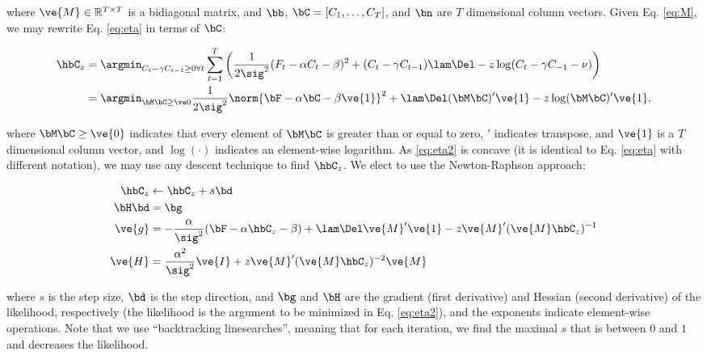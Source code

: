 \noindent where $\ve{M} \in \mathbb{R}^{T \times T}$ is a bidiagonal matrix,  and $\bb$, $\bC=[C_1,\ldots, C_T]$, and $\bn$ are $T$ dimensional column vectors. Given Eq. \eqref{eq:M}, we may rewrite Eq. \eqref{eq:eta} in terms of $\bC$:

\begin{align} 
\hbC_{\zzz} &= \argmin_{C_t - \gamma C_{t-1} \geq 0 \forall t} \sum_{t=1}^{T} \left( \frac{1}{2 \sig^2}(F_t - \alpha C_t - \beta)^2  + (C_t - \gamma C_{t-1}) \lam \Del - \zzz \log(C_t - \gamma C_{-1} -\nu ) \right) \nonumber \\
&= \az  \frac{1}{2 \sig^2} \norm{\bF - \alpha \bC -\beta \ve{1} }^2 + \lam \Del (\bM \bC )' \ve{1}  - \zzz \log(\bM \bC)'\ve{1},  \label{eq:eta2}
\end{align}

\noindent where $\bM \bC \geq \ve{0}$ indicates that every element of $\bM \bC$ is greater than or equal to zero, $'$ indicates transpose, and  $\ve{1}$ is a $T$ dimensional column vector, and $\log(\cdot)$ indicates an element-wise logarithm.  As \eqref{eq:eta2} is concave (it is identical to Eq. \eqref{eq:eta} with different notation), we may use any descent technique to find $\hbC_{\zzz}$.  We elect to use the Newton-Raphson approach: 


\begin{subequations} \label{eq:NR}
\begin{align}
\hbC_{\zzz} &\leftarrow \hbC_{\zzz} + s \bd \\
\bH \bd &= \bg \\
\ve{g} &= -\frac{\alpha}{\sig^2}(\bF -\alpha \hbC_{\zzz} - \beta) + \lam \Del \ve{M}' \ve{1} - \zzz \ve{M}' (\ve{M} \hbC_{\zzz})^{-1} \label{eq:g} \\
\ve{H} &= \frac{\alpha^2}{\sig^2} \ve{I} + \zzz \ve{M}' (\ve{M} \hbC_{\zzz})^{-2} \ve{M} \label{eq:H}
\end{align}
\end{subequations}

\noindent where $s$ is the step size, $\bd$ is the step direction, and $\bg$ and $\bH$ are the gradient (first derivative) and Hessian (second derivative) of the likelihood, respectively (the likelihood is the argument to be minimized in Eq. \eqref{eq:eta2}), and the exponents indicate element-wise operations. Note that we use ``backtracking linesearches'', meaning that for each iteration, we find the maximal $s$ that is between $0$ and $1$ and decreases the likelihood.

